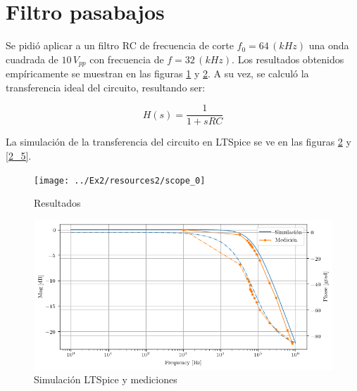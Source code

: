 \section{Filtro pasabajos}

Se pidió aplicar a un filtro RC de frecuencia de corte $f_{0}=64\,(kHz)$
una onda cuadrada de $10\,V_{pp}$ con frecuencia de $f=32\,(kHz)$. Los resultados obtenidos empíricamente se muestran
en las figuras \ref{2_1} y \ref{2_4}. A su vez, se calculó la transferencia
ideal del circuito, resultando ser:

\begin{equation}
H(s)=\frac{1}{1+sRC}\label{eq:2_4}
\end{equation}

La simulación de la transferencia del circuito en LTSpice se ve en las figuras \ref{2_4} y \ref{2_5}.

\begin{figure}[H]
\begin{centering}
\texttt{[image: ../Ex2/resources2/scope\_0]} 
\par\end{centering}
\caption{Resultados}
\label{2_1} 
\end{figure}

\begin{figure}[H]
\begin{centering}
\includegraphics[scale=0.65]{../Ex2/resources2/MedyPost} 
\par\end{centering}
\caption{Simulación LTSpice y mediciones}
\label{2_4}
\end{figure}

